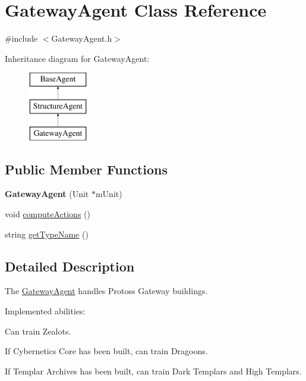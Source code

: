 \hypertarget{class_gateway_agent}{
\section{GatewayAgent Class Reference}
\label{class_gateway_agent}
}


{\ttfamily \#include $<$GatewayAgent.h$>$}

Inheritance diagram for GatewayAgent:\begin{figure}[H]
\begin{center}
\leavevmode
\includegraphics[height=3.000000cm]{class_gateway_agent}
\end{center}
\end{figure}
\subsection*{Public Member Functions}
\begin{DoxyCompactItemize}
\item 
\hypertarget{class_gateway_agent_ad0a3bc01881355a5a719fd4d0c471490}{
{\bfseries GatewayAgent} (Unit $\ast$mUnit)}
\label{class_gateway_agent_ad0a3bc01881355a5a719fd4d0c471490}

\item 
void \hyperlink{class_gateway_agent_a423351023b1a1ed7db6f254d26a0c1df}{computeActions} ()
\item 
string \hyperlink{class_gateway_agent_a6e427f6745502c494cdf42db4ec6d2e0}{getTypeName} ()
\end{DoxyCompactItemize}


\subsection{Detailed Description}
The \hyperlink{class_gateway_agent}{GatewayAgent} handles Protoss Gateway buildings.

Implemented abilities:
\begin{DoxyItemize}
\item Can train Zealots.
\item If Cybernetics Core has been built, can train Dragoons.
\item If Templar Archives has been built, can train Dark Templars and High Templars.
\end{DoxyItemize}

